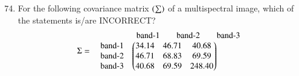 \documentclass[journal,12pt,onecolumn]{IEEEtran}
\theoremstyle{remark}
\begin{document}
\begin{enumerate}
\setcounter{enumi}{73}
\item For the following covariance matrix $\left(\sum\right)$ of a multispectral image, which of the statements is/are INCORRECT?
\[
\Sigma =
\\
\begin{array}{r @{\hspace{0.5em}} l}
    & 
\begin{array}{ccc}
        \text{band-$1$} & \quad \text{band-$2$} & \quad \text{band-$3$}
    \end{array} \\
   
\begin{array}{r}
        \text{band-$1$} \\ \text{band-$2$} \\ \text{band-$3$}
    \end{array}
    & 
\myvec{
        34.14 & 46.71 & 40.68 \\
        46.71 & 68.83 & 69.59 \\
        40.68 & 69.59 & 248.40}
\end{array}
\]


\end{enumerate}
\end{document}
